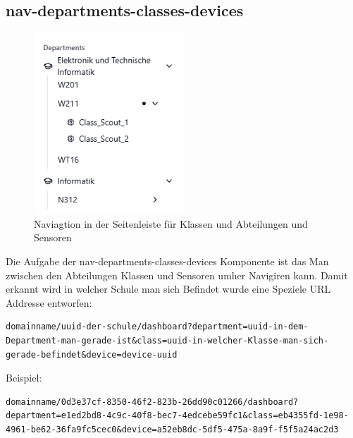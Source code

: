 \begin{inhalt}
\begin{enumerate}[label=\textbf{\arabic*.}]
\newpage

\subsection{nav-departments-classes-devices}


\begin{figure}[!htb]
\centering
\includegraphics[width=0.5\textwidth]{files/Thomas/pics/Website/Sidebar/nav-departments-classes-devices/nav-screen.png}
\caption[Naviagtion in der Seitenleiste für Klassen und Abteilungen und Sensoren]{Naviagtion in der Seitenleiste für Klassen und Abteilungen und Sensoren}
\label{fig:gehaeuse_internet_bild}
\end{figure}

\vspace{1cm}


Die Aufgabe der nav-departments-classes-devices Komponente ist das Man zwischen den Abteilungen Klassen und Sensoren umher Navigiren kann. Damit erkannt wird in welcher Schule man sich Befindet wurde eine Speziele URL Addresse entworfen:

\vspace{1cm}

\begin{lstlisting}[language=myurl, breaklines=true, breakatwhitespace=false, basicstyle=\ttfamily\small, columns=flexible]
domainname/uuid-der-schule/dashboard?department=uuid-in-dem-Department-man-gerade-ist&class=uuid-in-welcher-Klasse-man-sich-gerade-befindet&device=device-uuid
\end{lstlisting}

Beispiel:

\begin{lstlisting}[language=myurl, breaklines=true, breakatwhitespace=false, basicstyle=\ttfamily\small, columns=flexible]
domainname/0d3e37cf-8350-46f2-823b-26dd90c01266/dashboard?department=e1ed2bd8-4c9c-40f8-bec7-4edcebe59fc1&class=eb4355fd-1e98-4961-be62-36fa9fc5cec0&device=a52eb8dc-5df5-475a-8a9f-f5f5a24ac2d3
\end{lstlisting}





\end{enumerate}
\end{inhalt}
